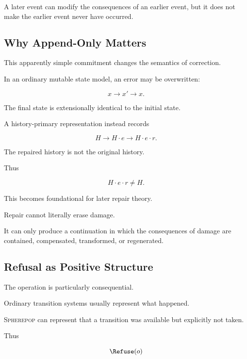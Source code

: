 \documentclass[11pt]{article}
\theoremstyle{remark}
\newcommand{\Spherepop}{\textsc{Spherepop}}
\begin{document}
A later event can modify the consequences of an earlier event, but it does not make the earlier event never have occurred.

\subsection{Why Append-Only Matters}

This apparently simple commitment changes the semantics of correction.

In an ordinary mutable state model, an error may be overwritten:

\begin{equation}
x
\rightarrow
x'
\rightarrow
x.
\end{equation}

The final state is extensionally identical to the initial state.

A history-primary representation instead records

\begin{equation}
H
\rightarrow
H\cdot e
\rightarrow
H\cdot e\cdot r.
\end{equation}

The repaired history is not the original history.

Thus

\begin{equation}
H\cdot e\cdot r
\neq
H.
\end{equation}

This becomes foundational for later repair theory.

Repair cannot literally erase damage.

It can only produce a continuation in which the consequences of damage are contained, compensated, transformed, or regenerated.

\subsection{Refusal as Positive Structure}

The \Refuse{} operation is particularly consequential.

Ordinary transition systems usually represent what happened.

\Spherepop{} can represent that a transition was available but explicitly not taken.

Thus

\begin{equation}
\Refuse(o)
\end{equation}
\end{document}
